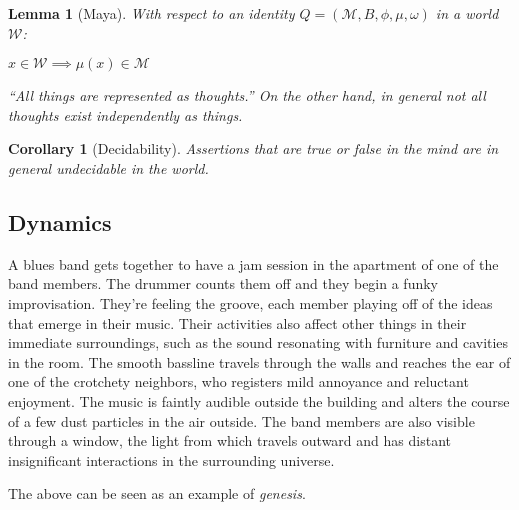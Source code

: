 \documentclass[pra,twocolumn,groupedaddress,10pt]{revtex4}
\newtheorem{lemma}[theorem]{Lemma}
\newtheorem{corollary}[theorem]{Corollary}
\theoremstyle{definition}
\begin{document}
\begin{lemma}[Maya] \label{lem:maya}
	With respect to an identity $Q = (\mathcal{M}, B, \phi, \mu, \omega)$ in a world $\mathcal{W}$:
	\begin{center}
		$x \in \mathcal{W} \implies \mu(x) \in \mathcal{M}$
	\end{center}
	``All things are represented as thoughts.'' On the other hand, in general not all thoughts exist independently as things.
\end{lemma}

\begin{corollary}[Decidability] \label{cor:decidability}
	Assertions that are true or false in the mind are in general undecidable in the world.
\end{corollary}

\subsection{Dynamics} \label{sec:dynamics}

A blues band gets together to have a jam session in the apartment of one of the band members. The drummer counts them off and they begin a funky improvisation. They're feeling the groove, each member playing off of the ideas that emerge in their music. Their activities also affect other things in their immediate surroundings, such as the sound resonating with furniture and cavities in the room. The smooth bassline travels through the walls and reaches the ear of one of the crotchety neighbors, who registers mild annoyance and reluctant enjoyment. The music is faintly audible outside the building and alters the course of a few dust particles in the air outside. The band members are also visible through a window, the light from which travels outward and has distant insignificant interactions in the surrounding universe.

The above can be seen as an example of \emph{genesis}.
\end{document}
